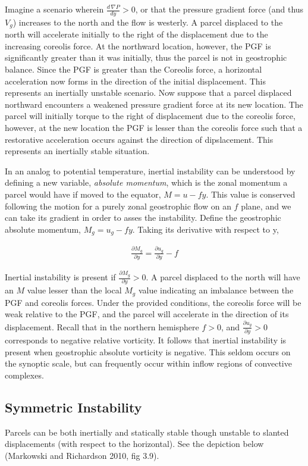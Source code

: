 \documentclass[a4paper,12pt]{article}
\begin{document}
Imagine a scenario wherein $\frac{d\,\nabla P}{dy} > 0$, or that the pressure gradient force (and thus $V_g$) increases to the north and the flow is westerly. A parcel displaced to the north will accelerate initially to the right of the displacement due to the increasing coreolis force. At the northward location, however, the PGF is significantly greater than it was initially, thus the parcel is not in geostrophic balance. Since the PGF is greater than the Coreolis force, a horizontal acceleration now forms in the direction of the initial displacement. This represents an inertially unstable scenario. Now suppose that a parcel displaced northward encounters a weakened pressure gradient force at its new location. The parcel will initially torque to the right of displacement due to the coreolis force, however, at the new location the PGF is lesser than the coreolis force such that a restorative acceleration occurs against the direction of dipslacement. This represents an inertially stable situation.

In an analog to potential temperature, inertial instability can be understood by defining a new variable, \emph{absolute momentum}, which is the zonal momentum a parcel would have if moved to the equator, $M = u - fy$. This value is conserved following the motion for a purely zonal geostrophic flow on an $f$ plane, and we can take its gradient in order to asses the instability. Define the geostrophic absolute momentum, $M_g = u_g - fy$. Taking its derivative with respect to y,

\begin{align*}
\frac{\partial M_g}{\partial y} = \frac{\partial u_g}{\partial y} - f
\end{align*}

Inertial instability is present if $\frac{\partial M_g}{\partial y} > 0$. A parcel displaced to the north will have an $M$ value lesser than the local $M_g$ value indicating an imbalance between the PGF and coreolis forces. Under the provided conditions, the coreolis force will be weak relative to the PGF, and the parcel will accelerate in the direction of its displacement. Recall that in the northern hemisphere $f > 0$, and $\frac{\partial u_g}{\partial y} > 0$ corresponds to negative relative vorticity. It follows that inertial instability is present when geostrophic absolute vorticity is negative. This seldom occurs on the synoptic scale, but can frequently occur within inflow regions of convective complexes.

\subsection*{Symmetric Instability}
Parcels can be both inertially and statically stable though unstable to slanted displacements (with respect to the horizontal). See the depiction below (Markowski and Richardson 2010, fig 3.9).
\end{document}
